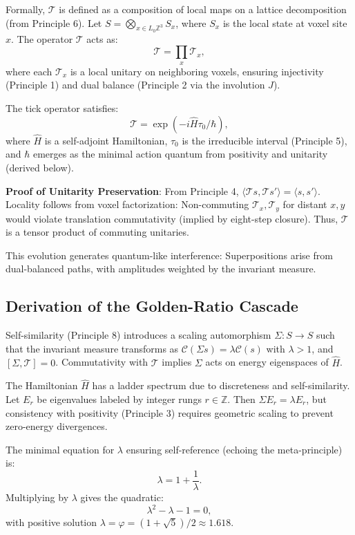 \documentclass[twocolumn,prd,amsmath,amssymb,aps,superscriptaddress,nofootinbib]{revtex4-2}
\begin{document}
Formally, $\mathcal{T}$ is defined as a composition of local maps on a lattice decomposition (from Principle 6). Let $S = \bigotimes_{x \in L_0 \mathbb{Z}^3} S_x$, where $S_x$ is the local state at voxel site $x$. The operator $\mathcal{T}$ acts as:
\[
\mathcal{T} = \prod_{x} \mathcal{T}_x,
\]
where each $\mathcal{T}_x$ is a local unitary on neighboring voxels, ensuring injectivity (Principle 1) and dual balance (Principle 2 via the involution $J$).

The tick operator satisfies:
\begin{equation}
\mathcal{T} = \exp\left(-i \widehat{H} \tau_0 / \hbar \right),
\label{eq:tick-operator}
\end{equation}
where $\widehat{H}$ is a self-adjoint Hamiltonian, $\tau_0$ is the irreducible interval (Principle 5), and $\hbar$ emerges as the minimal action quantum from positivity and unitarity (derived below).

\textbf{Proof of Unitarity Preservation}: From Principle 4, $\langle \mathcal{T} s, \mathcal{T} s' \rangle = \langle s, s' \rangle$. Locality follows from voxel factorization: Non-commuting $\mathcal{T}_x, \mathcal{T}_y$ for distant $x,y$ would violate translation commutativity (implied by eight-step closure). Thus, $\mathcal{T}$ is a tensor product of commuting unitaries.

This evolution generates quantum-like interference: Superpositions arise from dual-balanced paths, with amplitudes weighted by the invariant measure.

\subsection{Derivation of the Golden-Ratio Cascade}
\label{subsec:golden-ratio-cascade}

Self-similarity (Principle 8) introduces a scaling automorphism $\Sigma: S \to S$ such that the invariant measure transforms as $\mathcal{C}(\Sigma s) = \lambda \mathcal{C}(s)$ with $\lambda > 1$, and $[\Sigma, \mathcal{T}] = 0$. Commutativity with $\mathcal{T}$ implies $\Sigma$ acts on energy eigenspaces of $\widehat{H}$.

The Hamiltonian $\widehat{H}$ has a ladder spectrum due to discreteness and self-similarity. Let $E_r$ be eigenvalues labeled by integer rungs $r \in \mathbb{Z}$. Then $\Sigma E_r = \lambda E_r$, but consistency with positivity (Principle 3) requires geometric scaling to prevent zero-energy divergences.

The minimal equation for $\lambda$ ensuring self-reference (echoing the meta-principle) is:
\begin{equation}
\lambda = 1 + \frac{1}{\lambda}.
\label{eq:self-similarity-eq}
\end{equation}
Multiplying by $\lambda$ gives the quadratic:
\begin{equation}
\lambda^2 - \lambda - 1 = 0,
\label{eq:quadratic}
\end{equation}
with positive solution $\lambda = \varphi = (1 + \sqrt{5})/2 \approx 1.618$.
\end{document}
